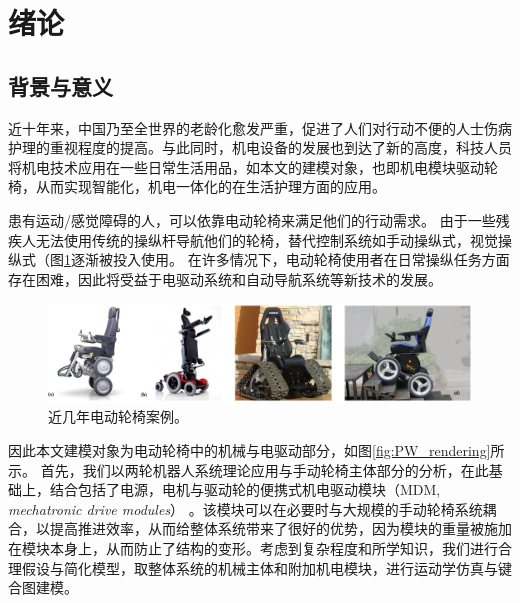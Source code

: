 \newpage
\setcounter{page}{1}
\cfoot{\thepage}

\section{绪论}
\subsection{背景与意义}

近十年来，中国乃至全世界的老龄化愈发严重，促进了人们对行动不便的人士伤病护理的重视程度的提高。与此同时，机电设备的发展也到达了新的高度，科技人员将机电技术应用在一些日常生活用品，如本文的建模对象，也即机电模块驱动轮椅，从而实现智能化，机电一体化的在生活护理方面的应用。

患有运动/感觉障碍的人，可以依靠电动轮椅来满足他们的行动需求。 由于一些残疾人无法使用传统的操纵杆导航他们的轮椅，替代控制系统如手动操纵式，视觉操纵式（图\ref{fig:smart_wheel_chairs}逐渐被投入使用。
在许多情况下，电动轮椅使用者在日常操纵任务方面存在困难，因此将受益于电驱动系统和自动导航系统等新技术的发展。

\begin{figure}[!h]
	\centering
	\includegraphics[width=1\textwidth]{fig/smart_wheel_chairs.png}
	\caption{近几年电动轮椅案例。}\label{fig:smart_wheel_chairs}
\end{figure}

因此本文建模对象为电动轮椅中的机械与电驱动部分，如图\ref{fig:PW_rendering}所示。
首先，我们以两轮机器人系统理论应用与手动轮椅主体部分的分析，在此基础上，结合包括了电源，电机与驱动轮的便携式机电驱动模块（MDM, \textit{mechatronic drive modules}） 。该模块可以在必要时与大规模的手动轮椅系统耦合，以提高推进效率，从而给整体系统带来了很好的优势，因为模块的重量被施加在模块本身上，从而防止了结构的变形。考虑到复杂程度和所学知识，我们进行合理假设与简化模型，取整体系统的机械主体和附加机电模块，进行运动学仿真与键合图建模。

